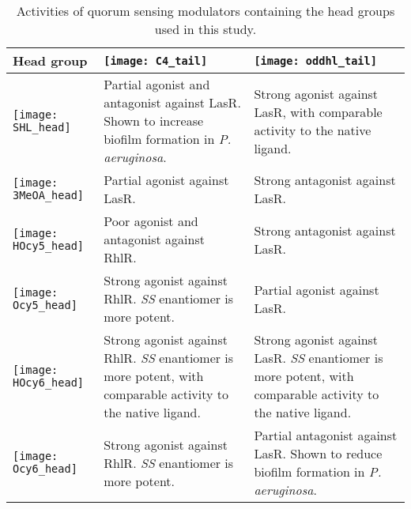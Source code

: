 \begin{table}[H]
  \centering
\begin{tabular}{|P{0.18\textwidth}|p{0.32\textwidth}|p{0.32\textwidth}|}
\hline 
 \vspace{8px}\textbf{Head group} & \vspace{0px}\centering\texttt{[image: C4\_tail]} & \centering\arraybackslash\vspace{0px}\texttt{[image: oddhl\_tail]} \\ 
\hline 
 \vspace{0px}\texttt{[image: SHL\_head]} & Partial agonist and antagonist against LasR\cite{McInnis2011}. Shown to increase biofilm formation in \textit{P. aeruginosa}\cite{Ganguly2011}.
 & Strong agonist against LasR, with comparable activity to the native ligand\cite{Smith2003,Boursier2018,Passador1996,McInnis2011}. \\ 
\hline 
 \vspace{0px}\texttt{[image: 3MeOA\_head]} 
 & Partial agonist against LasR\cite{Hodgkinson2012a}. 
 & Strong antagonist against LasR\cite{Hodgkinson2012a}. \\ 
\hline 
 \vspace{0px}\texttt{[image: HOcy5\_head]} 
 & Poor agonist and antagonist against RhlR\cite{Smith2003a,Jog2006}.
 & Strong antagonist against LasR\cite{Smith2003a}.\\ 
\hline 
 \vspace{0px}\texttt{[image: Ocy5\_head]} 
 & Strong agonist against RhlR\cite{Smith2003a}. \textit{SS} enantiomer is more potent\cite{Jog2006}.
 & Partial agonist against LasR\cite{Smith2003a}. \\ 
\hline 
 \vspace{0px}\texttt{[image: HOcy6\_head]} 
 & Strong agonist against RhlR\cite{Smith2003a}. \textit{SS} enantiomer is more potent, with comparable activity to the native ligand\cite{Jog2006}.
 & Strong agonist against LasR\cite{Smith2003,Smith2003a}. \textit{SS} enantiomer is more potent, with comparable activity to the native ligand\cite{Jog2006}.\\ 
\hline 
 \vspace{0px}\texttt{[image: Ocy6\_head]} 
 & Strong agonist against RhlR\cite{Smith2003a}. \textit{SS} enantiomer is more potent\cite{Jog2006}.
 & Partial antagonist against LasR\cite{Smith2003a}. Shown to reduce biofilm formation in \textit{P. aeruginosa}\cite{Smith2003a}.\\ 
\hline 
\end{tabular}
\caption{Activities of quorum sensing modulators containing the head groups used in this study.\label{tbl:head_groups}} 
\end{table}

